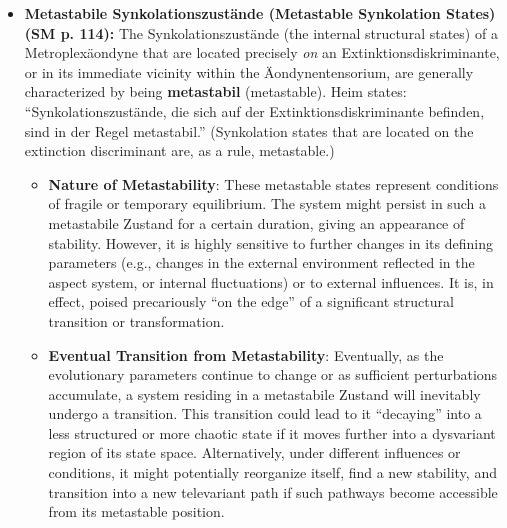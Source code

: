 \documentclass[12pt]{article}
\newcommand{\q}[1]{\enquote{#1}}
\begin{document}
\begin{itemize}
    \item \textbf{Metastabile Synkolationszustände (Metastable Synkolation States) (SM p. 114):}
    The Synkolationszustände (the internal structural states) of a Metroplexäondyne that are located precisely \textit{on} an Extinktionsdiskriminante, or in its immediate vicinity within the Äondynentensorium, are generally characterized by being \textbf{metastabil} (metastable). Heim states: \q{Synkolationszustände, die sich auf der Extinktionsdiskriminante befinden, sind in der Regel metastabil.} (Synkolation states that are located on the extinction discriminant are, as a rule, metastable.)
    \begin{itemize}
        \item \textbf{Nature of Metastability}: These metastable states represent conditions of fragile or temporary equilibrium. The system might persist in such a metastabile Zustand for a certain duration, giving an appearance of stability. However, it is highly sensitive to further changes in its defining parameters (e.g., changes in the external environment reflected in the aspect system, or internal fluctuations) or to external influences. It is, in effect, poised precariously \q{on the edge} of a significant structural transition or transformation.
        \item \textbf{Eventual Transition from Metastability}: Eventually, as the evolutionary parameters continue to change or as sufficient perturbations accumulate, a system residing in a metastabile Zustand will inevitably undergo a transition. This transition could lead to it \q{decaying} into a less structured or more chaotic state if it moves further into a dysvariant region of its state space. Alternatively, under different influences or conditions, it might potentially reorganize itself, find a new stability, and transition into a new televariant path if such pathways become accessible from its metastable position.
    \end{itemize}


\end{itemize}
\end{document}
